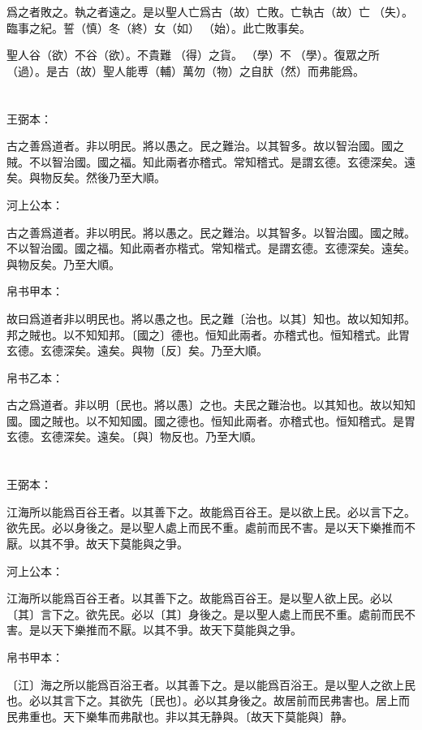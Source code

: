 \documentclass[a5paper]{ctexbook}
\begin{document}
    爲之者敗之。執之者遠之。是以聖人亡爲古（故）亡敗。亡執古（故）亡󶴡（失）。臨事之紀。誓（慎）冬（終）女（如）󶴢（始）。此亡敗事矣。

    聖人谷（欲）不谷（欲）。不貴難󶴫（得）之貨。𡥈（學）不𡥈（學）。復眾之所󶴬（過）。是古（故）聖人能尃（輔）萬勿（物）之自肰（然）而弗能爲。

    \chapter{}
    王弼本：

    古之善爲道者。非以明民。將以愚之。民之難治。以其智多。故以智治國。國之賊。不以智治國。國之福。知此兩者亦稽式。常知稽式。是謂玄德。玄德深矣。遠矣。與物反矣。然後乃至大順。

    河上公本：

    古之善爲道者。非以明民。將以愚之。民之難治。以其智多。以智治國。國之賊。不以智治國。國之福。知此兩者亦楷式。常知楷式。是謂玄德。玄德深矣。遠矣。與物反矣。乃至大順。

    帛书甲本：

    故曰爲道者非以明民也。將以愚之也。民之難〔治也。以其〕知也。故以知知邦。邦之賊也。以不知知邦。〔國之〕德也。恒知此兩者。亦稽式也。恒知稽式。此胃玄德。玄德深矣。遠矣。與物〔反〕矣。乃至大順。

    帛书乙本：

    古之爲道者。非以明〔民也。將以愚〕之也。夫民之難治也。以其知也。故以知知國。國之賊也。以不知知國。國之德也。恒知此兩者。亦稽式也。恒知稽式。是胃玄德。玄德深矣。遠矣。〔與〕物反也。乃至大順。

    \chapter{}
    王弼本：

    江海所以能爲百谷王者。以其善下之。故能爲百谷王。是以欲上民。必以言下之。欲先民。必以身後之。是以聖人處上而民不重。處前而民不害。是以天下樂推而不厭。以其不爭。故天下莫能與之爭。

    河上公本：

    江海所以能爲百谷王者。以其善下之。故能爲百谷王。是以聖人欲上民。必以〔其〕言下之。欲先民。必以〔其〕身後之。是以聖人處上而民不重。處前而民不害。是以天下樂推而不厭。以其不爭。故天下莫能與之爭。

    帛书甲本：

    〔江〕海之所以能爲百浴王者。以其善下之。是以能爲百浴王。是以聖人之欲上民也。必以其言下之。其欲先〔民也〕。必以其身後之。故居前而民弗害也。居上而民弗重也。天下樂隼而弗猒也。非以其无静與。〔故天下莫能與〕静。
\end{document}
